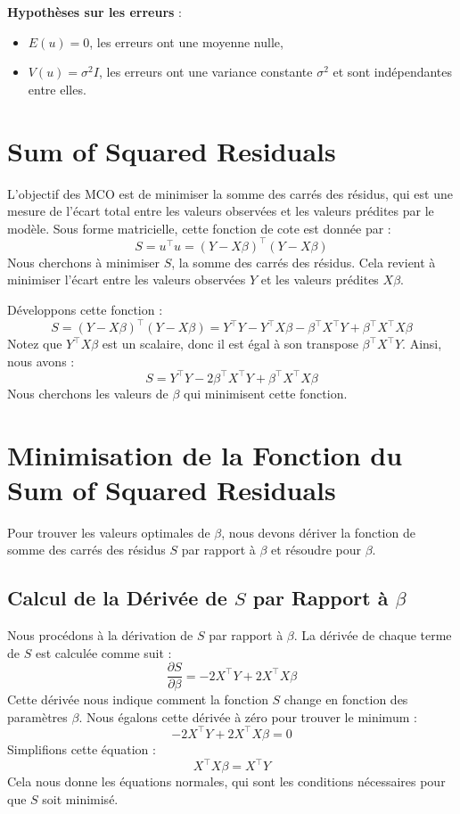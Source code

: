 \documentclass[14pt]{extarticle} %
\begin{document}
\textbf{Hypothèses sur les erreurs} :
\begin{itemize}
    \item \(E(u) = 0\), les erreurs ont une moyenne nulle,
    \item \(V(u) = \sigma^2I\), les erreurs ont une variance constante \(\sigma^2\) et sont indépendantes entre elles.
\end{itemize}

\section{Sum of Squared Residuals}
L'objectif des MCO est de minimiser la somme des carrés des résidus, qui est une mesure de l'écart total entre les valeurs observées et les valeurs prédites par le modèle. Sous forme matricielle, cette fonction de cote est donnée par :
\[
S = u^\top u = (Y - X\beta)^\top (Y - X\beta)
\]
Nous cherchons à minimiser \(S\), la somme des carrés des résidus. Cela revient à minimiser l'écart entre les valeurs observées \(Y\) et les valeurs prédites \(X\beta\).

Développons cette fonction :
\[
S = (Y - X\beta)^\top (Y - X\beta) = Y^\top Y - Y^\top X\beta - \beta^\top X^\top Y + \beta^\top X^\top X\beta
\]
Notez que \(Y^\top X\beta\) est un scalaire, donc il est égal à son transpose \( \beta^\top X^\top Y\). Ainsi, nous avons :
\[
S = Y^\top Y - 2\beta^\top X^\top Y + \beta^\top X^\top X\beta
\]
Nous cherchons les valeurs de \(\beta\) qui minimisent cette fonction.

\section{Minimisation de la Fonction du Sum of Squared Residuals}
Pour trouver les valeurs optimales de \(\beta\), nous devons dériver la fonction de somme des carrés des résidus \(S\) par rapport à \(\beta\) et résoudre pour \(\beta\).

\subsection{Calcul de la Dérivée de \(S\) par Rapport à \(\beta\)}
Nous procédons à la dérivation de \(S\) par rapport à \(\beta\). La dérivée de chaque terme de \(S\) est calculée comme suit :
\[
\frac{\partial S}{\partial \beta} = -2X^\top Y + 2X^\top X\beta
\]
Cette dérivée nous indique comment la fonction \(S\) change en fonction des paramètres \(\beta\). Nous égalons cette dérivée à zéro pour trouver le minimum :
\[
-2X^\top Y + 2X^\top X\beta = 0
\]
Simplifions cette équation :
\[
X^\top X\beta = X^\top Y
\]
Cela nous donne les équations normales, qui sont les conditions nécessaires pour que \(S\) soit minimisé.
\end{document}
